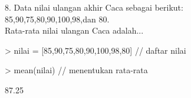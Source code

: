 \begin{eulernotebook}
    \eulersubheading{}
    \begin{eulercomment}
        8. Data nilai ulangan akhir Caca sebagai berikut:\\
        85,90,75,80,90,100,98,dan 80.\\
        Rata-rata nilai ulangan Caca adalah...
    \end{eulercomment}
    \begin{eulerprompt}
> nilai = [85,90,75,80,90,100,98,80] // daftar nilai
    \end{eulerprompt}
    \begin{euleroutput}
  [85,  90,  75,  80,  90,  100,  98,  80]
    \end{euleroutput}
    \begin{eulerprompt}
> mean(nilai) // menentukan rata-rata
    \end{eulerprompt}
    \begin{euleroutput}
  87.25
    \end{euleroutput}

        
\end{eulernotebook}

